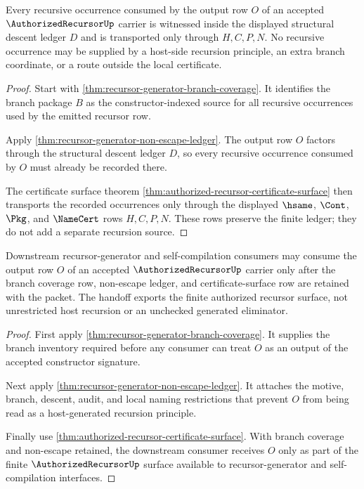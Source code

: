 \begin{theorem}
\label{thm:authorized-recursor-structural-descent-locality}
Every recursive occurrence consumed by the output row $O$ of an accepted $\AuthorizedRecursorUp$ carrier is witnessed inside the displayed structural descent ledger $D$ and is transported only through $H,C,P,N$. No recursive occurrence may be supplied by a host-side recursion principle, an extra branch coordinate, or a route outside the local certificate.
\end{theorem}
\begin{proof}
Start with \autoref{thm:recursor-generator-branch-coverage}. It identifies the branch package $B$ as the constructor-indexed source for all recursive occurrences used by the emitted recursor row.

Apply \autoref{thm:recursor-generator-non-escape-ledger}. The output row $O$ factors through the structural descent ledger $D$, so every recursive occurrence consumed by $O$ must already be recorded there.

The certificate surface theorem \autoref{thm:authorized-recursor-certificate-surface} then transports the recorded occurrences only through the displayed $\hsame$, $\Cont$, $\Pkg$, and $\NameCert$ rows $H,C,P,N$. These rows preserve the finite ledger; they do not add a separate recursion source.
\end{proof}

\begin{theorem}
\label{thm:authorized-recursor-output-consumer-handoff}
Downstream recursor-generator and self-compilation consumers may consume the output row $O$ of an accepted $\AuthorizedRecursorUp$ carrier only after the branch coverage row, non-escape ledger, and certificate-surface row are retained with the packet. The handoff exports the finite authorized recursor surface, not unrestricted host recursion or an unchecked generated eliminator.
\end{theorem}
\begin{proof}
First apply \autoref{thm:recursor-generator-branch-coverage}. It supplies the branch inventory required before any consumer can treat $O$ as an output of the accepted constructor signature.

Next apply \autoref{thm:recursor-generator-non-escape-ledger}. It attaches the motive, branch, descent, audit, and local naming restrictions that prevent $O$ from being read as a host-generated recursion principle.

Finally use \autoref{thm:authorized-recursor-certificate-surface}. With branch coverage and non-escape retained, the downstream consumer receives $O$ only as part of the finite $\AuthorizedRecursorUp$ \NameCert{} surface available to recursor-generator and self-compilation interfaces.
\end{proof}

